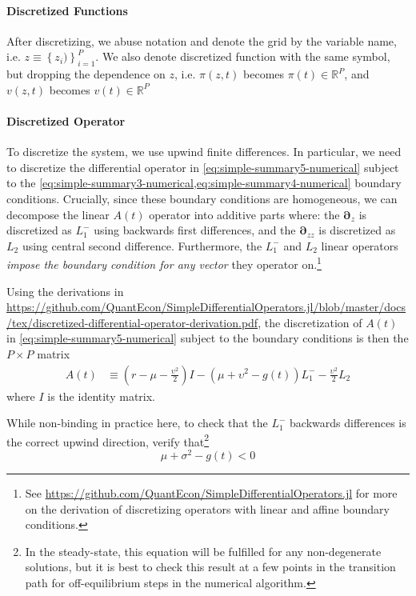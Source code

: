 \documentclass[11pt]{article}
\newcommand{\D}[1][]{\ensuremath{\boldsymbol{\partial}_{#1}}}
\newcommand{\R}{\ensuremath{\mathbb{R}}}
\newcommand{\set}[1]{\ensuremath{\left\{{#1}\right\}}}
\begin{document}
\paragraph{Discretized Functions}

After discretizing, we abuse notation and denote the grid by the variable name, i.e. $z \equiv \set{z_i)}_{i=1}^P$.  We also denote discretized function with the same symbol, but dropping the dependence on $z$, i.e. $\pi(z,t)$ becomes $\pi(t) \in \R^P$, and $v(z,t)$ becomes $v(t) \in \R^P$

\paragraph{Discretized Operator}

To discretize the system, we use upwind finite differences.  In particular, we need to discretize the differential operator in \cref{eq:simple-summary5-numerical} subject to the \cref{eq:simple-summary3-numerical,eq:simple-summary4-numerical} boundary conditions.  Crucially, since these boundary conditions are homogeneous, we can decompose the linear $A(t)$ operator into additive parts where: the $\D[z]$ is discretized as $L^{-}_1$ using backwards first differences, and the $\D[zz]$ is discretized as $L_2$ using central second difference.   Furthermore, the $L^{-}_1$ and $L_2$ linear operators \textit{impose the boundary condition for any vector} they operator on.\footnote{See \url{https://github.com/QuantEcon/SimpleDifferentialOperators.jl} for more on the derivation of discretizing operators with linear and affine boundary conditions.}

Using the derivations in \url{https://github.com/QuantEcon/SimpleDifferentialOperators.jl/blob/master/docs/tex/discretized-differential-operator-derivation.pdf}, the discretization of $A(t)$ in \cref{eq:simple-summary5-numerical} subject to the boundary conditions is then the $P \times P$ matrix
\begin{align}
A(t) &\equiv \left(r - \mu - \frac{\upsilon^2}{2}\right) I - (\mu + \upsilon^2 - g(t)) L^{-}_1 - \frac{\upsilon^2}{2} L_2 \label{eq:A-def-simple}
\end{align}
where $I$ is the identity matrix.

While non-binding in practice here, to check that the  $L^{-}_1$ backwards differences is the correct upwind direction, verify that\footnote{In the steady-state, this equation will be fulfilled for any non-degenerate solutions, but it is best to check this result at a few points in the transition path for off-equilibrium steps in the numerical algorithm.}
\begin{equation}
\mu + \sigma^2 - g(t) < 0
\end{equation}
\end{document}
